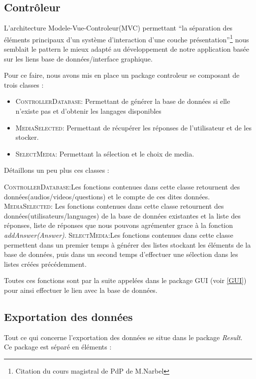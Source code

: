 \subsection{Contrôleur}\label{controller}

L'architecture Modele-Vue-Controleur(MVC) permettant ``la séparation des éléments principaux d'un système d'interaction d'une couche présentation''\footnote{Citation du cours magistral de PdP de M.Narbel} nous semblait le pattern le mieux adapté au développement de notre application basée sur les liens base de données/interface graphique.

Pour ce faire, nous avons mis en place un package controleur se composant de trois classes :

\begin{itemize}
  \item \textsc{ControllerDatabase}: Permettant de générer la base de données si elle n'existe pas et d'obtenir les langages disponibles
  \item \textsc{MediaSelected}: Permettant de récupérer les réponses de l'utilisateur et de les stocker.
  \item \textsc{SelectMedia}: Permettant la sélection et le choix de media.
\end{itemize}

Détaillons un peu plus ces classes :

\textsc{ControllerDatabase}:Les fonctions contenues dans cette classe retournent des données(audios/videos/questions) et le compte de ces dites données.
\textsc{MediaSelected}: Les fonctions contenues dans cette classe retournent des données(utilisateurs/languages) de la base de données existantes et la liste des réponses, liste de réponses que nous pouvons agrémenter grace à la fonction \textit{addAnswer(Answer)}.
\textsc{SelectMedia}:Les fonctions contenues dans cette classe permettent dans un premier temps à générer des listes stockant les éléments de la base de données, puis dans un second temps d'effectuer une sélection dans les listes créées précédemment.

Toutes ces fonctions sont par la suite appelées dans le package GUI (voir \ref{GUI}) pour ainsi effectuer le lien avec la base de données.

\subsection{Exportation des données}\label{export}

Tout ce qui concerne l'exportation des données se situe dans le package \textit{Result}. Ce package est séparé en 
 éléments :
 
